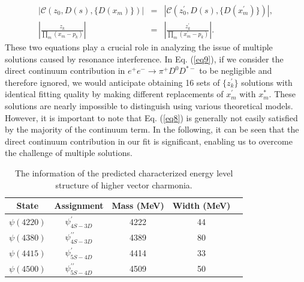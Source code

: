 \documentclass[prl,twocolumn,floatfix,amsmath,nofootinbib,amssymb,floatfix]{revtex4}
\begin{document}
\begin{eqnarray}
\left|\mathcal{C}(z_0,D(s),\{D(x_m)\})\right|&=&\left|\mathcal{C}(z_0^{\prime},D(s),\{D(x_m^{\prime})\})\right|, \label{eq8} \\
\left|\frac{z_k}{\prod_m(x_m-p_k)}\right|&=&\left|\frac{z_k^{\prime}}{\prod_m(x_m^{\prime}-p_k)}\right|. \label{eq9}
\end{eqnarray}
These two equations play a crucial role in analyzing the issue of multiple solutions caused by resonance interference. In Eq. (\ref{eq9}), if we consider the direct continuum contribution in $e^+e^- \to\pi^+ D^0 D^{*-}$ to be negligible and therefore ignored, we would anticipate obtaining 16 sets of $\{z_k^{\prime}\}$ solutions with identical fitting quality by making different replacements of $x_m^{\prime}$ with $x_m^*$. These solutions are nearly impossible to distinguish using various theoretical models. However, it is important to note that Eq. (\ref{eq8}) is generally not easily satisfied by the majority of the continuum term.  In the following, it can be seen that the direct continuum contribution in our fit is significant, enabling us to overcome the challenge of multiple solutions.


\renewcommand\arraystretch{1.6}
\begin{table}[b]
\caption{The information of the predicted characterized energy level structure of higher vector charmonia. \label{tab:inf}}
	\begin{tabular}{ccccc}
	\toprule[1pt]
 \toprule[1pt]
	State & Assignment  & Mass (MeV) \cite{Wang:2019mhs,Wang:2022jxj} & Width (MeV)  \cite{Wang:2019mhs,Wang:2022jxj}\\
	\midrule[1pt]
	$\psi(4220)$ & $\psi^{\prime}_{4S-3D}$ & 4222 & 44 \\
 $\psi(4380)$ & $\psi^{\prime\prime}_{4S-3D}$ & 4389 & 80 \\
 $\psi(4415)$ & $\psi^{\prime}_{5S-4D}$ & 4414 & 33 \\
 $\psi(4500)$ & $\psi^{\prime\prime}_{5S-4D}$ & 4509 & 50 \\
	\bottomrule[1pt]
 \bottomrule[1pt]
	\end{tabular}
\end{table}
\end{document}
